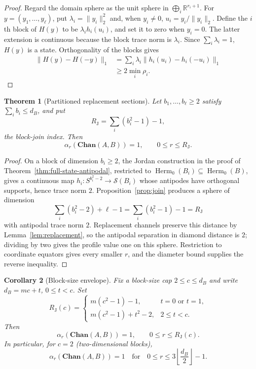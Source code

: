 \documentclass[11pt,a4paper]{article}
\theoremstyle{definition}
\theoremstyle{plain}
\newtheorem{theorem}{Theorem}[section]
\newtheorem{corollary}[theorem]{Corollary}
\theoremstyle{remark}
\DeclareMathOperator{\Herm}{Herm}
\newcommand{\Chan}{\mathbf{Chan}}
\newcommand{\Sstate}{\mathcal{S}}
\begin{document}
\begin{proof}
Regard the domain sphere as the unit sphere in
$\bigoplus_i\mathbb R^{r_i+1}$. For $y=(y_1,\ldots,y_\ell)$, put
$\lambda_i=\|y_i\|_2^2$ and, when $y_i\neq0$,
$u_i=y_i/\|y_i\|_2$. Define the $i$th block of $H(y)$ to be
$\lambda_i h_i(u_i)$, and set it to zero when $y_i=0$. The latter extension
is continuous because the block trace norm is $\lambda_i$. Since
$\sum_i\lambda_i=1$, $H(y)$ is a state. Orthogonality of the blocks gives
\begin{align*}
\|H(y)-H(-y)\|_1
&=\sum_i\lambda_i\|h_i(u_i)-h_i(-u_i)\|_1\\
&\geq2\min_i\rho_i.
\end{align*}
\end{proof}

\begin{theorem}[Partitioned replacement sections]
\label{thm:partition}
Let $b_1,\ldots,b_\ell\geq2$ satisfy $\sum_i b_i\leq d_B$, and put
\[
R_{\mathrm J}=\sum_i(b_i^2-1)-1,
\]
the block-join index. Then
\[
\alpha_r(\Chan(A,B))=1,
\qquad0\leq r\leq R_{\mathrm J}.
\]
\end{theorem}

\begin{proof}
On a block of dimension $b_i\geq2$, the Jordan construction in the proof of
Theorem~\ref{thm:full-state-antipodal}, restricted to
$\Herm_0(B_i)\subseteq\Herm_0(B)$, gives a continuous map
$h_i:S^{b_i^2-2}\to\Sstate(B_i)$ whose antipodes have orthogonal supports,
hence trace norm $2$. Proposition~\ref{prop:join} produces a sphere of dimension
\[
\sum_i(b_i^2-2)+\ell-1
=\sum_i(b_i^2-1)-1=R_{\mathrm J}
\]
with antipodal trace norm $2$. Replacement channels preserve this
distance by Lemma~\ref{lem:replacement}, so the antipodal separation in
diamond distance is $2$; dividing by two gives the profile value one on
this sphere. Restriction to coordinate equators gives every smaller $r$,
and the diameter bound supplies the reverse inequality.
\end{proof}

\begin{corollary}[Block-size envelope]
\label{cor:block-envelope}
Fix a block-size cap $2\leq c\leq d_B$ and write $d_B=mc+t$, $0\leq t<c$. Set
\[
R_{\mathrm J}(c)=
\begin{cases}
m(c^2-1)-1,&t=0\text{ or }t=1,\\
m(c^2-1)+t^2-2,&2\leq t<c.
\end{cases}
\]
Then
\[
\alpha_r(\Chan(A,B))=1,
\qquad0\leq r\leq R_{\mathrm J}(c).
\]
In particular, for $c=2$ (two-dimensional blocks),
\[
\alpha_r(\Chan(A,B))=1
\quad\text{for}\quad
0\leq r\leq3\left\lfloor\frac{d_B}{2}\right\rfloor-1.
\]
\end{corollary}
\end{document}
